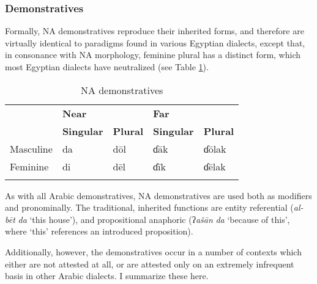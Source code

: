 \documentclass[output=paper]{langsci/langscibook}
\begin{document}
\subsubsection{Demonstratives} \label{demons}

Formally, NA demonstratives reproduce their inherited forms, and therefore are virtually identical to paradigms found in various Egyptian dialects, except that, in consonance with NA morphology, feminine plural has a distinct form, which most Egyptian dialects have neutralized (see Table \ref{demtab}).

\begin{table}
 
\begin{tabularx}{\textwidth}{XXXXX} 
\lsptoprule
& \multicolumn{2}{X}{\bfseries Near} & \multicolumn{2}{X}{\bfseries Far}\\
& \bfseries Singular & \bfseries Plural & \bfseries Singular & \bfseries Plural\\
Masculine & da & dōl & ɗāk & ɗōlak\\
Feminine & di & dēl & ɗīk & ɗēlak\\
\lspbottomrule
\end{tabularx}
\caption{
\label{bkm:Ref520909612}\label{tab:nigeria:}NA demonstratives
}
\label{demtab}
\end{table}

As with all Arabic demonstratives, NA demonstratives are used both as modifiers and pronominally. The traditional, inherited functions are entity referential (\textit{al-bēt} \textit{da} ‘this house’), and propositional anaphoric (ʔ\textit{ašān} \textit{da} ‘because of this’, where ‘this’ references an introduced proposition).

Additionally, however, the demonstratives occur in a number of contexts which either are not attested at all, or are attested only on an extremely infrequent basis in other Arabic dialects. I summarize these here.
\end{document}
